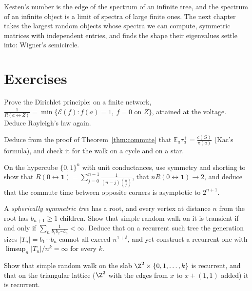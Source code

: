 Kesten's number is the edge of the spectrum of an infinite tree, and the spectrum of an infinite object is a limit of spectra of large finite ones. The next chapter takes the largest random objects whose spectra we can compute, symmetric matrices with independent entries, and finds the shape their eigenvalues settle into: Wigner's semicircle.

\section{Exercises}

\begin{exercise}[$\star$]\label{ex:dirichletprinciple}
Prove the Dirichlet principle: on a finite network, $\frac1{R(a\leftrightarrow Z)}=\min\{\mathcal E(f):f(a)=1,\ f=0\text{ on }Z\}$, attained at the voltage. Deduce Rayleigh's law again.
\end{exercise}

\begin{exercise}[$\star$]\label{ex:kac}
Deduce from the proof of Theorem~\ref{thm:commute} that $\mathbb E_a\tau_a^+=\frac{c(G)}{\pi(a)}$ (Kac's formula), and check it for the walk on a cycle and on a star.
\end{exercise}

\begin{exercise}[$\star$]\label{ex:hypercube}
On the hypercube $\{0,1\}^n$ with unit conductances, use symmetry and shorting to show that $R(0\leftrightarrow\mathbf 1)=\sum_{j=0}^{n-1}\frac1{(n-j)\binom nj}$, that $nR(0\leftrightarrow\mathbf 1)\to2$, and deduce that the
commute time between opposite corners is asymptotic to $2^{n+1}$.
\end{exercise}

\begin{exercise}[$\star\star$]\label{ex:spherical}
A \emph{spherically symmetric tree} has a root, and every vertex at distance $n$ from the root has $b_{n+1}\ge1$ children. Show that simple random walk on it is transient if and only if $\sum_n\frac1{b_1b_2\cdots b_n}<\infty$. Deduce that on a recurrent such tree the generation sizes $|T_n|=b_1\cdots b_n$
cannot all exceed $n^{1+\delta}$, and yet construct a recurrent one with $\limsup_n|T_n|/n^k=\infty$ for every $k$.
\end{exercise}

\begin{exercise}[$\star\star$]\label{ex:slab}
Show that simple random walk on the slab $\Z^2\times\{0,1,\dots,k\}$ is recurrent, and that on the triangular lattice ($\Z^2$ with the edges from $x$ to $x+(1,1)$ added) it is recurrent.
\end{exercise}

